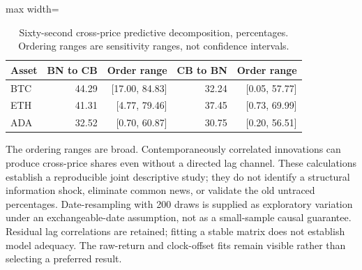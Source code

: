 \begin{table}[htbp]
\centering\small
\caption{Sixty-second cross-price predictive decomposition, percentages. Ordering ranges are sensitivity ranges, not confidence intervals.}\label{tab:joint_fevd_recovered}
\begin{adjustbox}{max width=\textwidth}
\begin{tabular}{lrrrr}\toprule
Asset & BN to CB & Order range & CB to BN & Order range\\\midrule
BTC & 44.29 & [17.00, 84.83] & 32.24 & [0.05, 57.77]\\
ETH & 41.31 & [4.77, 79.46] & 37.45 & [0.73, 69.99]\\
ADA & 32.52 & [0.70, 60.87] & 30.75 & [0.20, 56.51]\\
\bottomrule\end{tabular}
\end{adjustbox}
\end{table}

The ordering ranges are broad. Contemporaneously correlated innovations can produce cross-price shares even without a directed lag channel. These calculations establish a reproducible joint descriptive study; they do not identify a structural information shock, eliminate common news, or validate the old untraced percentages. Date-resampling with 200 draws is supplied as exploratory variation under an exchangeable-date assumption, not as a small-sample causal guarantee. Residual lag correlations are retained; fitting a stable matrix does not establish model adequacy. The raw-return and clock-offset fits remain visible rather than selecting a preferred result.

